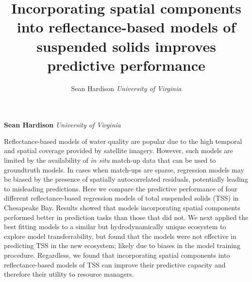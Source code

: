 \documentclass[11pt,]{article}
\title{Incorporating spatial components into reflectance-based models of
suspended solids improves predictive performance  }
\author{\Large Sean Hardison\vspace{0.05in} \newline\normalsize\emph{University of Virginia}  }
\date{}
\newcommand*{\authorfont}{\fontfamily{phv}\selectfont}
\renewenvironment{abstract}
{{%
  \setlength{\leftmargin}{0mm}
  \setlength{\rightmargin}{\leftmargin}%
}%
  \relax}
{\endlist}
\begin{document}
	
%

{%
\setlength{\parindent}{0pt}
\thispagestyle{plain}
{\fontsize{18}{20}\selectfont\raggedright 
\maketitle  %

}

{
   \vskip 13.5pt\relax \normalsize\fontsize{11}{12} 
\textbf{\authorfont Sean Hardison} \hskip 15pt \emph{\small University of Virginia}   

}

}








\begin{abstract}

    \hbox{\vrule height .2pt width 39.14pc}

    \vskip 8.5pt %

\noindent Reflectance-based models of water quality are popular due to the high
temporal and spatial coverage provided by satellite imagery. However,
such models are limited by the availability of \emph{in situ} match-up
data that can be used to groundtruth models. In cases when match-ups are
sparse, regression models may be biased by the presence of spatially
autocorrelated residuals, potentially leading to misleading predictions.
Here we compare the predictive performance of four different
reflectance-based regression models of total suspended solids (TSS) in
Chesapeake Bay. Results showed that models incorporating spatial
components performed better in prediction tasks than those that did not.
We next applied the best fitting models to a similar but
hydrodynamically unique ecosystem to explore model transferrability, but
found that the models were not effective in predicting TSS in the new
ecosystem; likely due to biases in the model training procedure.
Regardless, we found that incorporating spatial components into
reflectance-based models of TSS can improve their predictive capacity
and therefore their utility to resource managers.


    \hbox{\vrule height .2pt width 39.14pc}


\end{abstract}
\end{document}
